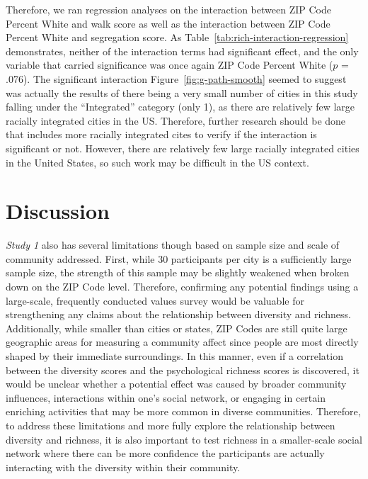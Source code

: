 \documentclass[
  man,floatsintext]{apa7}
\begin{document}
Therefore, we ran regression analyses on the interaction between ZIP Code Percent White and walk score as well as the interaction between ZIP Code Percent White and segregation score. As Table~\ref{tab:rich-interaction-regression} demonstrates, neither of the interaction terms had significant effect, and the only variable that carried significance was once again ZIP Code Percent White (\(p\) = .076). The significant interaction Figure~\ref{fig:g-path-smooth} seemed to suggest was actually the results of there being a very small number of cities in this study falling under the ``Integrated'' category (only 1), as there are relatively few large racially integrated cities in the US. Therefore, further research should be done that includes more racially integrated cites to verify if the interaction is significant or not. However, there are relatively few large racially integrated cities in the United States, so such work may be difficult in the US context.

\hypertarget{discussion}{%
\section{Discussion}\label{discussion}}

\emph{Study 1} also has several limitations though based on sample size and scale of community addressed. First, while 30 participants per city is a sufficiently large sample size, the strength of this sample may be slightly weakened when broken down on the ZIP Code level. Therefore, confirming any potential findings using a large-scale, frequently conducted values survey would be valuable for strengthening any claims about the relationship between diversity and richness. Additionally, while smaller than cities or states, ZIP Codes are still quite large geographic areas for measuring a community affect since people are most directly shaped by their immediate surroundings. In this manner, even if a correlation between the diversity scores and the psychological richness scores is discovered, it would be unclear whether a potential effect was caused by broader community influences, interactions within one's social network, or engaging in certain enriching activities that may be more common in diverse communities. Therefore, to address these limitations and more fully explore the relationship between diversity and richness, it is also important to test richness in a smaller-scale social network where there can be more confidence the participants are actually interacting with the diversity within their community.
\end{document}
